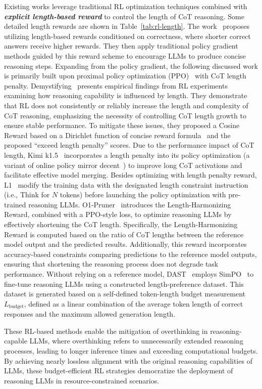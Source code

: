 Existing works leverage traditional RL optimization techniques combined with \textbf{\textit{explicit length-based reward}} to control the length of CoT reasoning. Some detailed length rewards are shown in Table~\ref{tab:rl-length}. 
The work~\cite{arora2025training} proposes utilizing length-based rewards conditioned on correctness, where shorter correct answers receive higher rewards. They then apply traditional policy gradient methods guided by this reward scheme to encourage LLMs to produce concise reasoning steps.
Expanding from the policy gradient, the following discussed work is primarily built upon proximal policy optimization (PPO)~\cite{schulman2017proximal} with CoT length penalty.
Demystifying~\cite{yeo2025demystifying} presents empirical findings from RL experiments examining how reasoning capability is influenced by length. They demonstrate that RL does not consistently or reliably increase the length and complexity of CoT reasoning, emphasizing the necessity of controlling CoT length growth to ensure stable performance. To mitigate these issues, they proposed a Cosine Reward based on a Dirichlet function of concise reward formula~\cite{loshchilov2016sgdr} and the proposed ``exceed length penalty'' scores.
Due to the performance impact of CoT length, Kimi k1.5~\cite{team2025kimi} incorporates a length penalty into its policy optimization (a variant of online policy mirror decent~\cite{tomar2020mirror}) to improve long CoT activations and facilitate effective model merging. Besides optimizing with length penalty reward, L1~\cite{aggarwal2025l1} modify the training data with the designated length constraint instruction (i.e., Think for $N$ tokens) before launching the policy optimization with pre-trained reasoning LLMs. 
O1-Pruner~\cite{luo2025o1} introduces the Length-Harmonizing Reward, combined with a PPO-style loss, to optimize reasoning LLMs by effectively shortening the CoT length. Specifically, the Length-Harmonizing Reward is computed based on the ratio of CoT lengths between the reference model output and the predicted results. Additionally, this reward incorporates accuracy-based constraints comparing predictions to the reference model outputs, ensuring that shortening the reasoning process does not degrade task performance.
Without relying on a reference model, DAST~\cite{shen2025dast} employs SimPO~\cite{meng2024simpo} to fine-tune reasoning LLMs using a constructed length-preference dataset. This dataset is generated based on a self-defined token-length budget measurement $L_\text{budget}$, defined as a linear combination of the average token length of correct responses and the maximum allowed generation length.

These RL-based methods enable the mitigation of overthinking in reasoning-capable LLMs, where overthinking refers to unnecessarily extended reasoning processes, leading to longer inference times and exceeding computational budgets. By achieving nearly lossless alignment with the original reasoning capabilities of LLMs, these budget-efficient RL strategies democratize the deployment of reasoning LLMs in resource-constrained scenarios.

